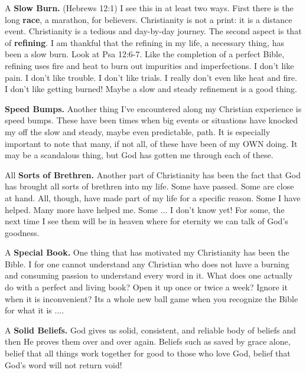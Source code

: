 \begin{compactenum}[I.][19]
    \item A \textbf{Slow Burn.} (Hebrews 12:1) I see this in at least two ways.  First there is the long \textbf{race}, a marathon, for believers. Christianity is not a print: it is a distance event. Christianity is a tedious and day-by-day journey. The second aspect is that of \textbf{refining}. I am thankful that the refining in my life, a necessary thing, has been a slow burn. Look at Psa 12:6-7. Like the completion of a perfect Bible, refining uses fire and heat to burn out impurities and imperfections. I don't like pain. I don't like trouble. I don't like trials. I really don't even like heat and fire.  I don't like getting burned! Maybe a slow and steady refinement is a good thing. 
    \item \textbf{Speed Bumps.} Another thing I've encountered along my Christian experience is speed bumps.  These have been times when big events or situations have knocked my off the slow and steady, maybe even predictable, path. It is especially important to note that many, if not all, of these have been of my OWN doing.  It may be a scandalous thing, but God has gotten me through each of these. %
    \item All \textbf{Sorts of Brethren.} Another part of Christianity has been the fact that God has brought all sorts of brethren into my life. Some have passed.  Some are close at hand. All, though, have made part of my life for a specific reason. Some I have helped. Many more have helped me. Some ... I don't know yet! For some, the next time I see them will be in heaven where for eternity we can talk of God's goodness. %
    \item A \textbf{Special Book.} One thing that has motivated my Christianity has been the Bible.  I for one cannot understand any Christian who does not have a burning and consuming passion to understand every word in it.  What does one actually do with a perfect and living book? Open it up once or twice a week? Ignore it when it is inconvenient? Its a whole new ball game when you recognize the Bible for what it is .... %
    \item A \textbf{Solid Beliefs.} God gives us solid, consistent, and reliable body of beliefs and then He proves them over and over again.  Beliefs such as saved by grace alone, belief that all things work together for good to those who love God, belief that God's word will not return void!%

\end{compactenum}
